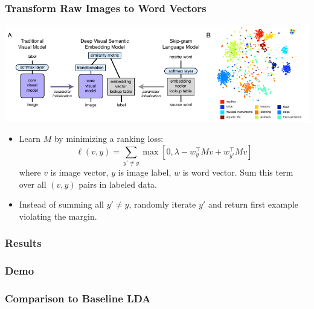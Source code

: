 \documentclass{beamer}
\begin{document}
\begin{frame}
  \frametitle{Transform Raw Images to Word Vectors}
  \begin{center}
    \includegraphics[width=\textwidth]{assets/devise.pdf}
  \end{center}
  \begin{itemize}
    \item Learn $M$ by minimizing a ranking loss: $$\ell(v, y) = \sum_{y' \neq y} \max \left[0, \lambda - w_{y}^\top M v + w_{y'} ^\top M v \right]$$ where $v$ is image vector, $y$ is image label, $w$ is word vector. Sum this term over all $(v, y)$ pairs in labeled data.
    \item Instead of summing all $y' \neq y$, randomly iterate $y'$ and return first example violating the margin.
  \end{itemize}
\end{frame}

\begin{frame}
  \frametitle{Results}
\end{frame}

\begin{frame}
  \frametitle{Demo}
\end{frame}


\begin{frame}
  \frametitle{Comparison to Baseline LDA}
\end{frame}
\end{document}
